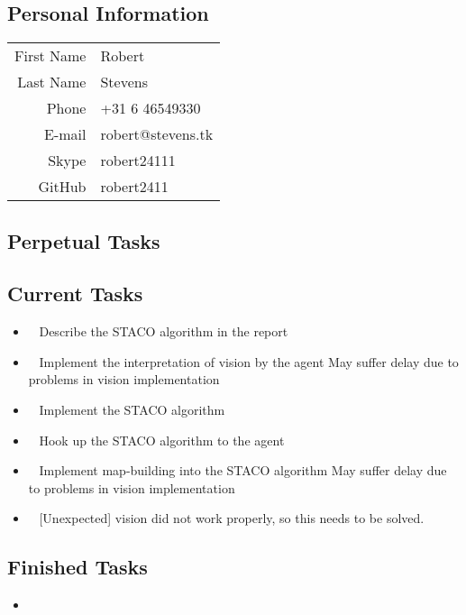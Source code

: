 \subsection{Personal Information}
\begin{table}[h!]
	\begin{tabular}{rl}
	First Name 	& Robert\\
	Last Name	& Stevens\\
	Phone		& +31 6 46549330\\
	E-mail		& robert@stevens.tk\\
	Skype		& robert24111\\
	GitHub		& robert2411
\end{tabular}
\end{table}

\subsection{Perpetual Tasks}

\subsection{Current Tasks}
\begin{itemize}
	\item~
	Describe the STACO algorithm in the report
	\item~
	Implement the interpretation of vision by the agent
		\subitem May suffer delay due to problems in vision implementation
	\item~
	Implement the STACO algorithm
	\item~
	Hook up the STACO algorithm to the agent
	\item~
	Implement map-building into the STACO algorithm
		\subitem May suffer delay due to problems in vision implementation
	\item~
	[Unexpected] vision did not work properly, so this needs to be solved.
\end{itemize}

\subsection{Finished Tasks}
\begin{itemize}
	\item
\end{itemize}
